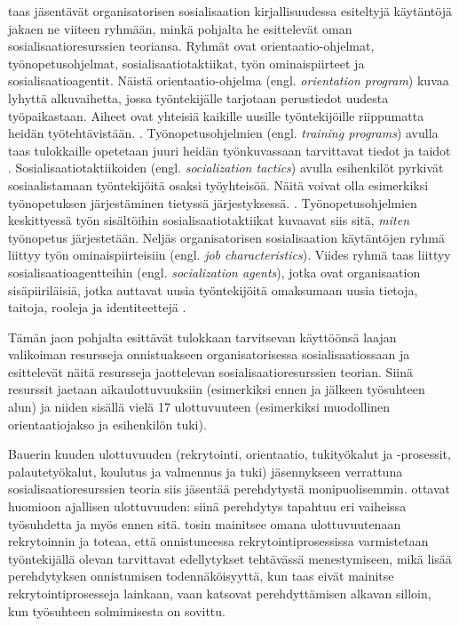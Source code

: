 \documentclass[utf8]{gradu3}
\begin{document}
\textcite{saks-gruman-2012} taas jäsentävät organisatorisen sosialisaation kirjallisuudessa esiteltyjä käytäntöjä jakaen ne viiteen ryhmään, minkä pohjalta he esittelevät oman sosialisaatioresurssien teoriansa. Ryhmät ovat orientaatio-ohjelmat, työnopetusohjelmat, sosialisaatiotaktiikat, työn ominaispiirteet ja sosialisaatioagentit. Näistä orientaatio-ohjelma (engl. \textit{orientation program}) kuvaa lyhyttä alkuvaihetta, jossa työntekijälle tarjotaan perustiedot uudesta työpaikastaan. Aiheet ovat yhteisiä kaikille uusille työntekijöille riippumatta heidän työtehtävistään. \parencite{saks-gruman-2012}. Työnopetusohjelmien (engl. \textit{training programs}) avulla taas tulokkaille opetetaan juuri heidän työnkuvassaan tarvittavat tiedot ja taidot \parencite{saks-gruman-2012}. Sosialisaatiotaktiikoiden (engl. \textit{socialization tactics}) avulla esihenkilöt pyrkivät sosiaalistamaan työntekijöitä osaksi työyhteisöä. Näitä voivat olla esimerkiksi työnopetuksen järjestäminen tietyssä järjestyksessä. \parencite{saks-gruman-2012}. Työnopetusohjelmien keskittyessä työn sisältöihin sosialisaatiotaktiikat kuvaavat siis sitä, \textit{miten} työnopetus järjestetään. Neljäs organisatorisen sosialisaation käytäntöjen ryhmä liittyy työn ominaispiirteisiin (engl. \textit{job characteristics}). Viides ryhmä taas liittyy sosialisaatioagentteihin (engl. \textit{socialization agents}), jotka ovat organisaation sisäpiiriläisiä, jotka auttavat uusia työntekijöitä omaksumaan uusia tietoja, taitoja, rooleja ja identiteettejä \parencite{saks-gruman-2012}.

Tämän jaon pohjalta \textcite{saks-gruman-2012} esittävät tulokkaan tarvitsevan käyttöönsä laajan valikoiman resursseja onnistuakseen organisatorisessa sosialisaatiossaan ja esittelevät näitä resursseja jaottelevan sosialisaatioresurssien teorian. Siinä resurssit jaetaan aikaulottuvuuksiin (esimerkiksi ennen ja jälkeen työsuhteen alun) ja niiden sisällä vielä 17 ulottuvuuteen (esimerkiksi muodollinen orientaatiojakso ja esihenkilön tuki).

Bauerin kuuden ulottuvuuden (rekrytointi, orientaatio, tukityökalut ja -prosessit, palautetyökalut, koulutus ja valmennus ja tuki) jäsennykseen verrattuna sosialisaatioresurssien teoria \parencite{saks-gruman-2012} siis jäsentää perehdytystä monipuolisemmin. \textcite{saks-gruman-2012} ottavat huomioon ajallisen ulottuvuuden: siinä perehdytys tapahtuu eri vaiheissa työsuhdetta ja myös ennen sitä. \textcite{bauer-2010} tosin mainitsee omana ulottuvuutenaan rekrytoinnin ja toteaa, että onnistuneessa rekrytointiprosessissa varmistetaan työntekijällä olevan tarvittavat edellytykset tehtävässä menestymiseen, mikä lisää perehdytyksen onnistumisen todennäköisyyttä, kun taas \textcite{saks-gruman-2012} eivät mainitse rekrytointiprosesseja lainkaan, vaan katsovat perehdyttämisen alkavan silloin, kun työsuhteen solmimisesta on sovittu. 
\end{document}
